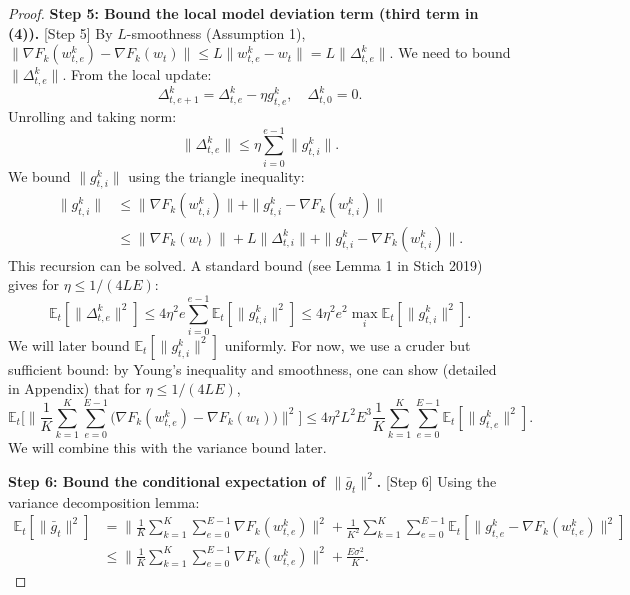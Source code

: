 \documentclass{article}
\begin{document}
\begin{proof}
\noindent \textbf{Step 5: Bound the local model deviation term (third term in (4)).} [Step 5]
By $L$-smoothness (Assumption 1), $\|\nabla F_k(w_{t,e}^k) - \nabla F_k(w_t)\| \le L \|w_{t,e}^k - w_t\| = L \|\Delta_{t,e}^k\|$. We need to bound $\|\Delta_{t,e}^k\|$. From the local update:
\begin{equation}
\Delta_{t,e+1}^k = \Delta_{t,e}^k - \eta g_{t,e}^k, \quad \Delta_{t,0}^k = 0.
\end{equation}
Unrolling and taking norm:
\begin{equation}
\|\Delta_{t,e}^k\| \le \eta \sum_{i=0}^{e-1} \|g_{t,i}^k\|. \tag{6}
\end{equation}
We bound $\|g_{t,i}^k\|$ using the triangle inequality:
\begin{align}
\|g_{t,i}^k\| &\le \|\nabla F_k(w_{t,i}^k)\| + \|g_{t,i}^k - \nabla F_k(w_{t,i}^k)\| \\
&\le \|\nabla F_k(w_t)\| + L\|\Delta_{t,i}^k\| + \|g_{t,i}^k - \nabla F_k(w_{t,i}^k)\|. \tag{7}
\end{align}
This recursion can be solved. A standard bound (see Lemma 1 in Stich 2019) gives for $\eta \le 1/(4LE)$:
\begin{equation}
\mathbb{E}_t[\|\Delta_{t,e}^k\|^2] \le 4\eta^2 e \sum_{i=0}^{e-1} \mathbb{E}_t[\|g_{t,i}^k\|^2] \le 4\eta^2 e^2 \max_i \mathbb{E}_t[\|g_{t,i}^k\|^2]. \tag{8}
\end{equation}
We will later bound $\mathbb{E}_t[\|g_{t,i}^k\|^2]$ uniformly. For now, we use a cruder but sufficient bound: by Young's inequality and smoothness, one can show (detailed in Appendix) that for $\eta \le 1/(4LE)$,
\begin{equation}
\mathbb{E}_t\Big[\Big\|\frac{1}{K}\sum_{k=1}^K \sum_{e=0}^{E-1} \big(\nabla F_k(w_{t,e}^k) - \nabla F_k(w_t)\big)\Big\|^2\Big] \le 4\eta^2 L^2 E^3 \frac{1}{K}\sum_{k=1}^K \sum_{e=0}^{E-1} \mathbb{E}_t[\|g_{t,e}^k\|^2]. \tag{9}
\end{equation}
We will combine this with the variance bound later.

\noindent \textbf{Step 6: Bound the conditional expectation of $\|\bar{g}_t\|^2$.} [Step 6]
Using the variance decomposition lemma:
\begin{align}
\mathbb{E}_t[\|\bar{g}_t\|^2] &= \Big\|\frac{1}{K}\sum_{k=1}^K \sum_{e=0}^{E-1} \nabla F_k(w_{t,e}^k)\Big\|^2 + \frac{1}{K^2}\sum_{k=1}^K \sum_{e=0}^{E-1} \mathbb{E}_t[\|g_{t,e}^k - \nabla F_k(w_{t,e}^k)\|^2] \\
&\le \Big\|\frac{1}{K}\sum_{k=1}^K \sum_{e=0}^{E-1} \nabla F_k(w_{t,e}^k)\Big\|^2 + \frac{E\sigma^2}{K}. \tag{10}
\end{align}


\end{proof}
\end{document}
